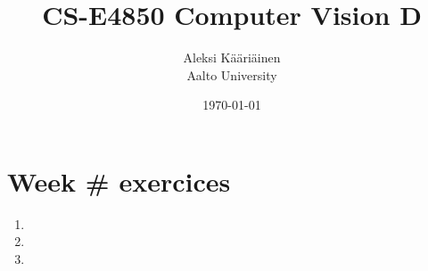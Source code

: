 \documentclass[11pt,a4paper]{article}
\title{CS-E4850 Computer Vision D}
\author{Aleksi Kääriäinen  \\
	Aalto University  \\
	}
\begin{document}
\date{\today}

\maketitle

\newpage

\section*{Week \# exercices}

\begin{enumerate}
      \item

            \newpage

      \item

            \newpage

      \item

            \newpage

\end{enumerate}
\end{document}
